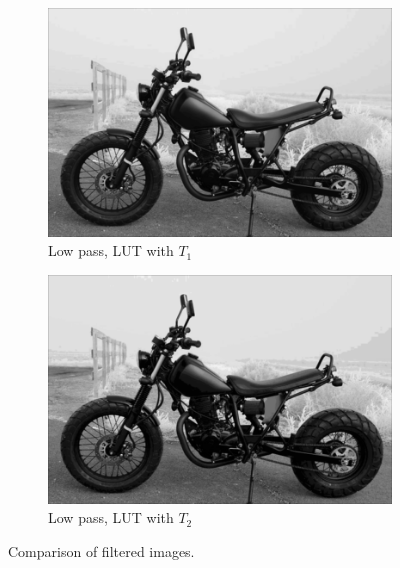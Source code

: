 \documentclass{beamer}
\begin{document}
\begin{frame}
\begin{figure}[h]
\begin{subfigure}[b]{0.4\textwidth} \includegraphics[width=\textwidth]{motor_lut_121.png} \caption{Low pass, LUT with $T_1$} %
\end{subfigure}
\begin{subfigure}[b]{0.4\textwidth} \includegraphics[width=\textwidth]{motor_lut_242.png} \caption{Low pass, LUT with $T_2$} \end{subfigure}
\caption{Comparison of filtered images.}
\end{figure}
\end{frame}
\end{document}
